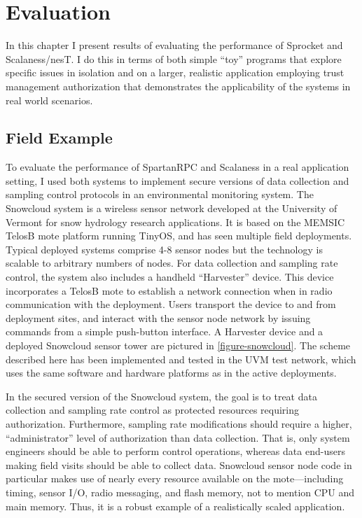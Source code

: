 
\chapter{Evaluation}
\label{chapter-evaluation}

In this chapter I present results of evaluating the performance of Sprocket and Scalaness/nesT.
I do this in terms of both simple ``toy'' programs that explore specific issues in isolation and
on a larger, realistic application employing trust management authorization that demonstrates
the applicability of the systems in real world scenarios.

\section{Field Example}
\label{section-field-example}

To evaluate the performance of SpartanRPC and Scalaness in a real application setting, I used
both systems to implement secure versions of data collection and sampling control protocols in
an environmental monitoring system. The Snowcloud system
\cite{frolik-skalka-snowcloudtr,moeser-walker-skalka-frolik-wsc11} is a wireless sensor network
developed at the University of Vermont for snow hydrology research applications. It is based on
the MEMSIC TelosB mote platform running TinyOS, and has seen multiple field deployments. Typical
deployed systems comprise 4-8 sensor nodes but the technology is scalable to arbitrary numbers
of nodes. For data collection and sampling rate control, the system also includes a handheld
``Harvester'' device. This device incorporates a TelosB mote to establish a network connection
when in radio communication with the deployment. Users transport the device to and from
deployment sites, and interact with the sensor node network by issuing commands from a simple
push-button interface. A Harvester device and a deployed Snowcloud sensor tower are pictured in
\autoref{figure-snowcloud}. The scheme described here has been implemented and tested in the UVM
test network, which uses the same software and hardware platforms as in the active deployments.

\snowcloudfig

In the secured version of the Snowcloud system, the goal is to treat data collection and
sampling rate control as protected resources requiring authorization. Furthermore, sampling rate
modifications should require a higher, ``administrator'' level of authorization than data
collection. That is, only system engineers should be able to perform control operations, whereas
data end-users making field visits should be able to collect data. Snowcloud sensor node code in
particular makes use of nearly every resource available on the mote---including timing, sensor
I/O, radio messaging, and flash memory, not to mention CPU and main memory. Thus, it is a robust
example of a realistically scaled application.

